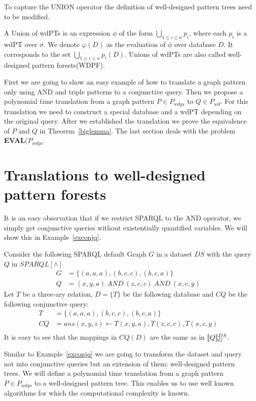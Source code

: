 To capture the UNION operator the definition of well-designed pattern trees
need to be modified.  
\begin{definition}
	A Union of wdPTs is an expression $\phi$ of the form $\bigcup_{1\leq i \leq n} p_i$, 
	where each $p_i$ is a wdPT over $\sigma$.
	We denote $\varphi(D)$ as the evaluation of $\phi$ over database $D$.
	It corresponds to the set $\bigcup_{1\leq i \leq n}p_i(D)$.
	Unions of wdPTs are also called well-designed pattern
	forests(WDPF).
\end{definition}



First we are going to show an easy example of how to translate a graph pattern
only using AND and triple patterns to a conjunctive query. Then we propose a
polynomial time translation from a graph pattern $P \in P_{wdgs}$ to $Q \in P_{wd}$. For this
translation we need to construct a special database and a wdPT depending on the
original query. After we established the translation we prove the equivalence of $P$ and $Q$ in
Theorem~\ref{biglemma}. The last section deals with the problem
\textbf{EVAL}($P_{wdgs}$.

\section{Translations to well-designed pattern forests}
It is an easy observation that if we restrict SPARQL to the AND operator, we
simply get conjunctive queries without existentially quantified variables.
We will show this in Example~\ref{exconjq}. 
\begin{example}\label{exconjq}
	Consider the following SPARQL default Graph $G$ in a dataset $DS$ with the query $Q$ in $SPARQL[\land]$
	\begin{align*}
		G &=\{ (a,a,a), (b,c,c), (b,c,a)  \}\\
		Q &= (x,y,a) \ AND \ (z,c,c) \ AND \ (x,c,y)
	\end{align*}
	Let $T$ be a three-ary relation, $D = \{ T \}$ be the following database and
	$CQ$ be the following 
	conjunctive query: 
	\begin{align*}
		T &= \{ (a,a,a), (b,c,c), (b,c,a)\}\\
		CQ &= ans(x,y,z) \leftarrow T(x,y,a), T(z,c,c), T(x,c,y)\\
	\end{align*}
	It is easy to see that the mappings in $CQ(D)$ are the same as in $\llbracket Q
	\rrbracket_G^{DS}$.
\end{example}
Similar to Example~\ref{exconjq} we are going to transform the dataset and query 
not into conjunctive queries but an extension of them: well-designed pattern
trees. We 
will define a polynomial time translation from a graph pattern $P \in P_{wdgs}$
to a well-designed pattern tree. This enables us to use well known algorithms 
for which the computational complexity is known. 

